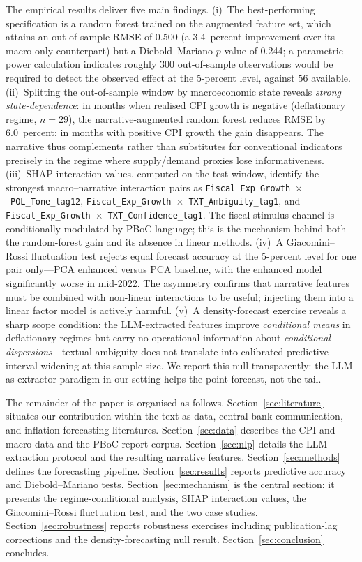 \documentclass[AER]{AEA}
\begin{document}
The empirical results deliver five main findings. (i)~The best-performing
specification is a random forest trained on the augmented feature set, which
attains an out-of-sample RMSE of \num{0.500} (a \num{3.4}~percent
improvement over its macro-only counterpart) but a Diebold--Mariano $p$-value
of \num{0.244}; a parametric power calculation indicates roughly $300$
out-of-sample observations would be required to detect the observed
effect at the 5-percent level, against $56$ available. (ii)~Splitting the
out-of-sample window by macroeconomic state reveals \emph{strong
state-dependence}: in months when realised CPI growth is negative
(deflationary regime, $n=29$), the narrative-augmented random forest
reduces RMSE by \num{6.0}~percent; in months with positive CPI growth the
gain disappears. The narrative thus complements rather than substitutes
for conventional indicators precisely in the regime where supply/demand
proxies lose informativeness. (iii)~SHAP interaction values, computed on
the test window, identify the strongest macro--narrative interaction pairs
as \texttt{Fiscal\_Exp\_Growth}~$\times$~\texttt{POL\_Tone\_lag12},
\texttt{Fiscal\_Exp\_Growth}~$\times$~\texttt{TXT\_Ambiguity\_lag1}, and
\texttt{Fiscal\_Exp\_Growth}~$\times$~\texttt{TXT\_Confidence\_lag1}. The
fiscal-stimulus channel is conditionally modulated by PBoC language; this
is the mechanism behind both the random-forest gain and its absence in
linear methods. (iv)~A Giacomini--Rossi fluctuation test rejects equal
forecast accuracy at the 5-percent level for one pair only---PCA enhanced
versus PCA baseline, with the enhanced model significantly worse in mid-2022.
The asymmetry confirms that narrative features must be combined with
non-linear interactions to be useful; injecting them into a linear factor
model is actively harmful. (v)~A density-forecast exercise reveals a sharp
scope condition: the LLM-extracted features improve \emph{conditional means}
in deflationary regimes but carry no operational information about
\emph{conditional dispersions}---textual ambiguity does not translate into
calibrated predictive-interval widening at this sample size. We report this
null transparently: the LLM-as-extractor paradigm in our setting helps the
point forecast, not the tail.

The remainder of the paper is organised as follows.
Section~\ref{sec:literature} situates our contribution within the
text-as-data, central-bank communication, and inflation-forecasting
literatures. Section~\ref{sec:data} describes the CPI and macro data and
the PBoC report corpus. Section~\ref{sec:nlp} details the LLM extraction
protocol and the resulting narrative features. Section~\ref{sec:methods}
defines the forecasting pipeline. Section~\ref{sec:results} reports
predictive accuracy and Diebold--Mariano tests. Section~\ref{sec:mechanism}
is the central section: it presents the regime-conditional analysis,
SHAP interaction values, the Giacomini--Rossi fluctuation test, and the
two case studies. Section~\ref{sec:robustness} reports robustness
exercises including publication-lag corrections and the density-forecasting
null result. Section~\ref{sec:conclusion} concludes.
\end{document}
